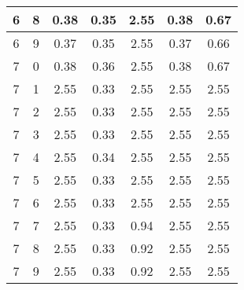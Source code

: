 \begin{longtable}{|c|c||c||c|c||c|c|}
	6 & 8 & 0.38 & 0.35 & 2.55 & 0.38 & 0.67 \\ \hline
	6 & 9 & 0.37 & 0.35 & 2.55 & 0.37 & 0.66 \\ \hline
	7 & 0 & 0.38 & 0.36 & 2.55 & 0.38 & 0.67 \\ \hline
	7 & 1 & 2.55 & 0.33 & 2.55 & 2.55 & 2.55 \\ \hline
	7 & 2 & 2.55 & 0.33 & 2.55 & 2.55 & 2.55 \\ \hline
	7 & 3 & 2.55 & 0.33 & 2.55 & 2.55 & 2.55 \\ \hline
	7 & 4 & 2.55 & 0.34 & 2.55 & 2.55 & 2.55 \\ \hline
	7 & 5 & 2.55 & 0.33 & 2.55 & 2.55 & 2.55 \\ \hline
	7 & 6 & 2.55 & 0.33 & 2.55 & 2.55 & 2.55 \\ \hline
	7 & 7 & 2.55 & 0.33 & 0.94 & 2.55 & 2.55 \\ \hline
	7 & 8 & 2.55 & 0.33 & 0.92 & 2.55 & 2.55 \\ \hline
	7 & 9 & 2.55 & 0.33 & 0.92 & 2.55 & 2.55 \\ \hline
\end{longtable}
\clearpage{}
